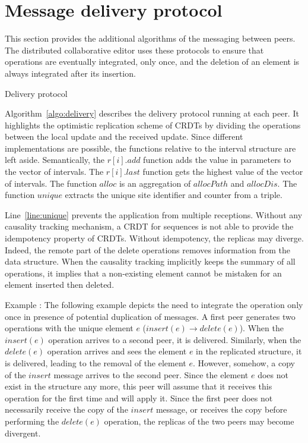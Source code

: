 
\section{Message delivery protocol}
\label{sec:messagedelivery}
This section provides the additional algorithms of the messaging between
peers. The distributed collaborative editor \CRATE uses these protocols
to ensure that operations are eventually integrated, only once, and the
deletion of an element is always integrated after its insertion.

\begin{algorithm}[h]
  
  \caption{\label{algo:delivery}Delivery protocol}
\end{algorithm}

Algorithm~\ref{algo:delivery} describes the delivery protocol running at each
peer. It highlights the optimistic replication scheme of CRDTs by dividing the
operations between the local update and the received update.  Since different
implementations are possible, the functions relative to the interval structure
are left aside. Semantically, the $r[i].add$ function adds the value in
parameters to the vector of intervals. The $r[i].last$ function gets the
highest value of the vector of intervals. The function $alloc$ is an
aggregation of $allocPath$ and $allocDis$. The function $unique$ extracts the
unique site identifier and counter from a triple.

Line~\ref{line:unique} prevents the application from multiple
receptions. Without any causality tracking mechanism, a CRDT for sequences is
not able to provide the idempotency property of CRDTs. Without idempotency, the
replicas may diverge. Indeed, the remote part of the delete operations removes
information from the data structure. When the causality tracking implicitly
keeps the summary of all operations, it implies that a non-existing element
cannot be mistaken for an element inserted then deleted.

\begin{asparadesc}
\item[Example \EXAMPLE{}:] The following example depicts the need to integrate
  the operation only once in presence of potential duplication of messages. A
  first peer generates two operations with the unique element $e$ ($insert(e)
  \rightarrow delete(e)$). When the $insert(e)$ operation arrives to a second
  peer, it is delivered. Similarly, when the $delete(e)$ operation arrives and
  sees the element $e$ in the replicated structure, it is delivered, leading to
  the removal of the element $e$. However, somehow, a copy of the $insert$
  message arrives to the second peer. Since the element $e$ does not exist in
  the structure any more, this peer will assume that it receives this operation
  for the first time and will apply it. Since the first peer does not
  necessarily receive the copy of the $insert$ message, or receives the copy
  before performing the $delete(e)$ operation, the replicas of the two peers
  may become divergent.
\end{asparadesc}


